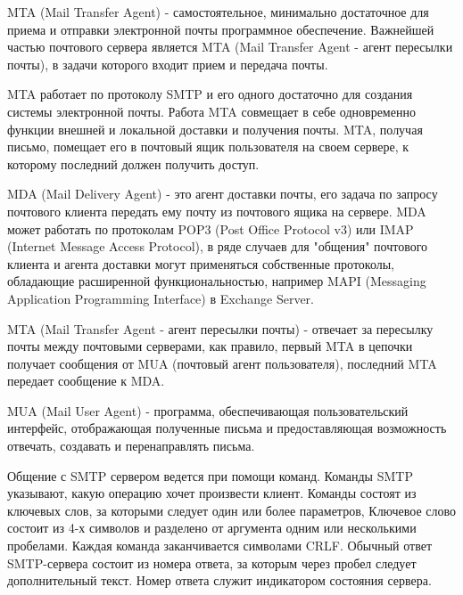 \documentclass[a4paper,12pt]{report}
\begin{document}
	MTA (Mail Transfer Agent) - самостоятельное, минимально достаточное для приема и отправки электронной почты программное обеспечение. Важнейшей частью почтового сервера является MTA (Mail Transfer Agent - агент пересылки почты), в задачи которого входит прием и передача почты.

	MTA работает по протоколу SMTP и его одного достаточно для создания системы электронной почты. Работа MTA совмещает в себе одновременно функции внешней и локальной доставки и получения почты. MTA, получая письмо, помещает его в почтовый ящик пользователя на своем сервере, к которому последний должен получить доступ.

	MDA (Mail Delivery Agent) - это агент доставки почты, его задача по запросу почтового клиента передать ему почту из почтового ящика на сервере. MDA может работать по протоколам POP3 (Post Office Protocol v3) или IMAP (Internet Message Access Protocol), в ряде случаев для "общения" почтового клиента и агента доставки могут применяться собственные протоколы, обладающие расширенной функциональностью, например MAPI (Messaging Application Programming Interface) в Exchange Server.

	MTA (Mail Transfer Agent - агент пересылки почты) - отвечает за пересылку почты между почтовыми серверами, как правило, первый MTA в цепочки получает сообщения от MUA (почтовый агент пользователя), последний MTA передает сообщение к MDA.

	MUA (Mail User Agent) - программа, обеспечивающая пользовательский интерфейс, отображающая полученные письма и предоставляющая возможность отвечать, создавать и перенаправлять письма.

	Общение с SMTP сервером ведется при помощи команд. Команды SMTP указывают, какую операцию хочет произвести клиент. Команды состоят из ключевых слов, за которыми следует один или более параметров, Ключевое слово состоит из 4-х символов и разделено от аргумента одним или несколькими пробелами. Каждая команда заканчивается символами CRLF. Обычный ответ SMTP-сервера состоит из номера ответа, за которым через пробел следует дополнительный текст. Номер ответа служит индикатором состояния сервера.
\end{document}
